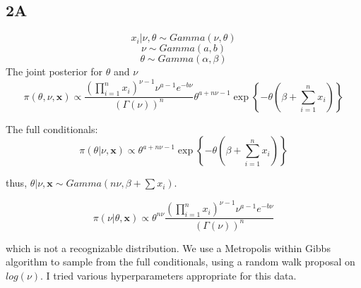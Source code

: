 \documentclass[]{article}
\begin{document}
\subsection{2A}\label{a-1}

\[x_i |\nu,\theta \sim Gamma(\nu,\theta)\] \[\nu \sim Gamma(a,b)\]
\[\theta \sim Gamma(\alpha,\beta)\] The joint posterior for \(\theta\)
and \(\nu\)
\[\pi(\theta,\nu,\pmb{x}) \propto  \frac{\left(\prod_{i=1}^nx_i \right)^{\nu-1}\nu^{a-1} e^{-b\nu}}{\left(\Gamma(\nu) \right)^n} \theta^{a+n\nu-1} \exp\left\{-\theta\left(\beta + \sum_{i=1}^n x_i \right) \right\}\]

The full conditionals:
\[\pi(\theta|\nu, \pmb{x}) \propto \theta^{a+n\nu-1}\exp\left\{-\theta\left(\beta + \sum_{i=1}^n x_i \right) \right\}\]

thus, \(\theta|\nu, \pmb{x} \sim Gamma(n\nu, \beta + \sum x_i)\).

\[\pi(\nu|\theta,\pmb{x}) \propto \theta^{n\nu}\frac{\left(\prod_{i=1}^nx_i \right)^{\nu-1}\nu^{a-1} e^{-b\nu}}{\left(\Gamma(\nu) \right)^n}\]

which is not a recognizable distribution. We use a Metropolis within
Gibbs algorithm to sample from the full conditionals, using a random
walk proposal on \(log(\nu)\). I tried various hyperparameters
appropriate for this data.
\end{document}
